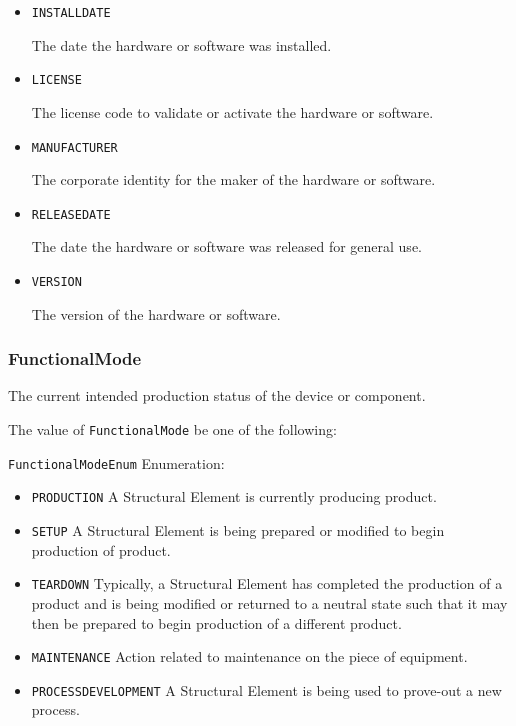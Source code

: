 \begin{itemize}

\item \texttt{INSTALL\textunderscore DATE}


The date the hardware or software was installed.

\item \texttt{LICENSE}


The license code to validate or activate the hardware or software.

\item \texttt{MANUFACTURER}


The corporate identity for the maker of the hardware or software.


\item \texttt{RELEASE\textunderscore DATE}


The date the hardware or software was released for general use.


\item \texttt{VERSION}


The version of the hardware or software.


\end{itemize}

\subsubsection{FunctionalMode}
\label{sec:FunctionalMode}



The current intended production status of the device or component.


The value of \texttt{FunctionalMode} \MUST be one of the following: 


\texttt{FunctionalModeEnum} Enumeration:

\begin{itemize}
\item \texttt{PRODUCTION} \newline A \gls{Structural Element} is currently producing product. 
\item \texttt{SETUP} \newline A \gls{Structural Element} is being prepared or modified to begin production of product. 
\item \texttt{TEARDOWN} \newline Typically, a \gls{Structural Element} has completed the production of a product and is being modified or returned to a neutral state such that it may then be prepared to begin production of a different product. 
\item \texttt{MAINTENANCE} \newline Action related to maintenance on the piece of equipment. 
\item \texttt{PROCESS\textunderscore DEVELOPMENT} \newline A \gls{Structural Element} is being used to prove-out a new process. 
\end{itemize}

